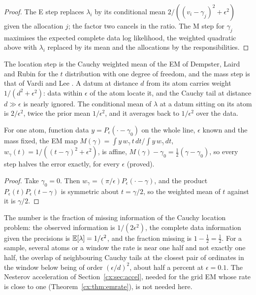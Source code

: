 \begin{proof}
The E step replaces $\lambda_i$ by its conditional mean $2/((v_i-\gamma_j)^2+\epsilon^2)$ given the allocation $j$; the factor two cancels in the ratio. The M step for $\gamma_j$ maximises the expected complete data log likelihood, the weighted quadratic above with $\lambda_i$ replaced by its mean and the allocations by the responsibilities.
\end{proof}

The location step is the Cauchy weighted mean of the EM of Dempster, Laird and Rubin for the $t$ distribution with one degree of freedom, and the mass step is that of Vardi and Lee \cite{VardiLee93}. A datum at distance $d$ from its atom carries weight $1/(d^2+\epsilon^2)$: data within $\epsilon$ of the atom locate it, and the Cauchy tail at distance $d\gg\epsilon$ is nearly ignored. The conditional mean of $\lambda$ at a datum sitting on its atom is $2/\epsilon^2$, twice the prior mean $1/\epsilon^2$, and it averages back to $1/\epsilon^2$ over the data.

\begin{proposition}\label{cx:prop:ratehalf}
For one atom, function data $y=P_\epsilon(\cdot-\gamma_0)$ on the whole line, $\epsilon$ known and the mass fixed, the EM map $M(\gamma)=\int y\,w_\gamma\,t\,dt\big/\int y\,w_\gamma\,dt$, $w_\gamma(t)=1/((t-\gamma)^2+\epsilon^2)$, is affine, $M(\gamma)-\gamma_0=\tfrac12(\gamma-\gamma_0)$, so every step halves the error exactly, for every $\epsilon$ (proved).
\end{proposition}

\begin{proof}
Take $\gamma_0=0$. Then $w_\gamma=(\pi/\epsilon)P_\epsilon(\cdot-\gamma)$, and the product $P_\epsilon(t)P_\epsilon(t-\gamma)$ is symmetric about $t=\gamma/2$, so the weighted mean of $t$ against it is $\gamma/2$.
\end{proof}

The number is the fraction of missing information of the Cauchy location problem: the observed information is $1/(2\epsilon^2)$, the complete data information given the precisions is $\mathbb{E}[\lambda]=1/\epsilon^2$, and the fraction missing is $1-\tfrac12=\tfrac12$. For a sample, several atoms or a window the rate is near one half and not exactly one half, the overlap of neighbouring Cauchy tails at the closest pair of ordinates in the window below being of order $(\epsilon/d)^2$, about half a percent at $\epsilon=0.1$. The Nesterov acceleration of Section~\ref{cx:sec:accel}, needed for the grid EM whose rate is close to one (Theorem~\ref{cx:thm:emrate}), is not needed here.


